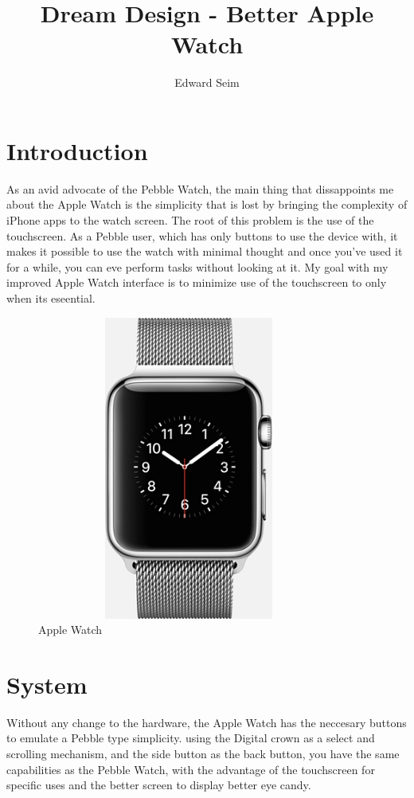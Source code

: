 \documentclass[journal,letterpaper]{article}
\title{Dream Design - Better Apple Watch}
\author{Edward Seim}
\begin{document}
    \maketitle
    
    \section{Introduction}
    \label{introduction}

    As an avid advocate of the Pebble Watch, the main thing that dissappoints me about the Apple Watch is the simplicity that is lost by bringing the complexity of iPhone apps to the watch screen. The root of this problem is the use of the touchscreen. As a Pebble user, which has only buttons to use the device with, it makes it possible to use the watch with minimal thought and once you've used it for a while, you can eve perform tasks without looking at it. My goal with my improved Apple Watch interface is to minimize use of the touchscreen to only when its eseential.

    \begin{figure}[h]
        \centering
        \includegraphics[width=10cm,height=10cm,keepaspectratio]{apple-watch}
        \caption{Apple Watch}
        \label{fig:apple_watch}
    \end{figure}

    \section{System}
    \label{System}

    Without any change to the hardware, the Apple Watch has the neccesary buttons to emulate a Pebble type simplicity. using the Digital crown as a select and scrolling mechanism, and the side button as the back button, you have the same capabilities as the Pebble Watch, with the advantage of the touchscreen for specific uses and the better screen to display better eye candy.
\end{document}
